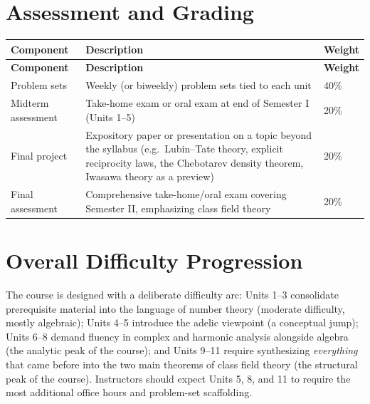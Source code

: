 \documentclass[11pt]{article}
\begin{document}
\section{Assessment and Grading}
\begin{longtable}{@{}L{3.3cm} L{9.6cm} C{1.6cm}@{}}
\toprule
\textbf{Component} & \textbf{Description} & \textbf{Weight} \\
\midrule
\endfirsthead
\toprule
\textbf{Component} & \textbf{Description} & \textbf{Weight} \\
\midrule
\endhead
Problem sets & Weekly (or biweekly) problem sets tied to each unit & 40\% \\
Midterm assessment & Take-home exam or oral exam at end of Semester I (Units 1--5) & 20\% \\
Final project & Expository paper or presentation on a topic beyond the syllabus (e.g.\ Lubin--Tate theory, explicit reciprocity laws, the Chebotarev density theorem, Iwasawa theory as a preview) & 20\% \\
Final assessment & Comprehensive take-home/oral exam covering Semester II, emphasizing class field theory & 20\% \\
\bottomrule
\end{longtable}

\section{Overall Difficulty Progression}
The course is designed with a deliberate difficulty arc: Units 1--3 consolidate prerequisite material into the language of number theory (moderate difficulty, mostly algebraic); Units 4--5 introduce the adelic viewpoint (a conceptual jump); Units 6--8 demand fluency in complex and harmonic analysis alongside algebra (the analytic peak of the course); and Units 9--11 require synthesizing \emph{everything} that came before into the two main theorems of class field theory (the structural peak of the course). Instructors should expect Units 5, 8, and 11 to require the most additional office hours and problem-set scaffolding.

\end{document}

